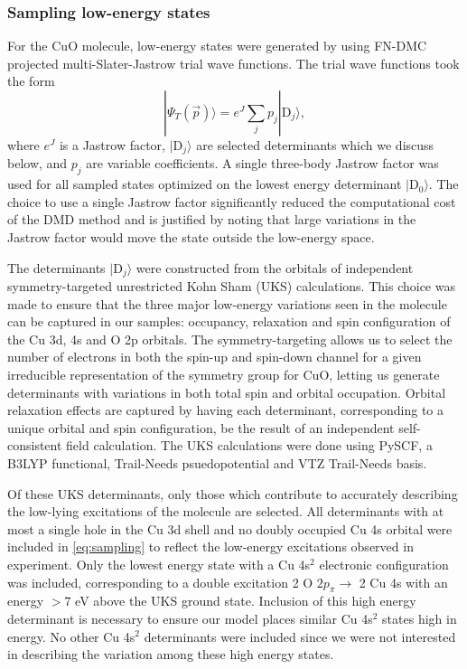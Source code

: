 \documentclass[12pt]{article}
\begin{document}
\subsubsection{Sampling low-energy states}
For the CuO molecule, low-energy states were generated by using FN-DMC projected multi-Slater-Jastrow trial wave functions.
The trial wave functions took the form
\begin{equation}
|\Psi_T(\vec{p}) \rangle =  e^{J}\sum_{j} p_j|\text{D}_j\rangle,
\label{eq:sampling}
\end{equation}
where $e^J$ is a Jastrow factor, $|\text{D}_j\rangle$ are selected determinants which we discuss below, and $p_j$ are variable coefficients.
A single three-body Jastrow factor was used for all sampled states optimized on the lowest energy determinant $|\text{D}_0 \rangle$.
The choice to use a single Jastrow factor significantly reduced the computational cost of the DMD method and is justified by noting that large variations in the Jastrow factor would move the state outside the low-energy space.

The determinants $|\text{D}_j \rangle$ were constructed from the orbitals of independent symmetry-targeted unrestricted Kohn Sham (UKS) calculations.
This choice was made to ensure that the three major low-energy variations seen in the molecule can be captured in our samples: occupancy, relaxation and spin configuration of the Cu 3d, 4s and O 2p orbitals.
The symmetry-targeting allows us to select the number of electrons in both the spin-up and spin-down channel for a given irreducible representation of the symmetry group for CuO, letting us generate determinants with variations in both total spin and orbital occupation.
Orbital relaxation effects are captured by having each determinant, corresponding to a unique orbital and spin configuration, be the result of an independent self-consistent field calculation.
The UKS calculations were done using PySCF, a B3LYP functional, Trail-Needs psuedopotential and VTZ Trail-Needs basis.

Of these UKS determinants, only those which contribute to accurately describing the low-lying excitations of the molecule are selected.
All determinants with at most a single hole in the Cu 3d shell and no doubly occupied Cu 4s orbital were included in \eqref{eq:sampling} to reflect the low-energy excitations observed in experiment.
Only the lowest energy state with a Cu 4s$^2$ electronic configuration was included, corresponding to a double excitation 2 O ${2p_\pi} \rightarrow$ 2 Cu 4s with an energy $>7$ eV above the UKS ground state.
Inclusion of this high energy determinant is necessary to ensure our model places similar Cu 4s$^2$ states high in energy.
No other Cu 4s$^2$ determinants were included since we were not interested in describing the variation among these high energy states.
\end{document}
